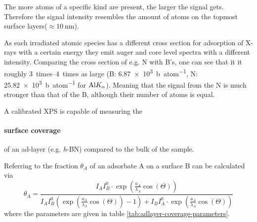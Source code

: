 The more atoms of a specific kind are present, the larger the signal gets. Therefore the signal intensity resembles the amount of atoms on the topmost surface layers($\approx \SI{10}{\nm}$).

As each irradiated atomic species has a different cross section for adsorption of X-rays with a certain energy they emit auger and core level spectra with a different intensity. Comparing the cross section of e.g. N with B's, one can see that it it roughly \SIrange{3}{4}{times} as large (B: \SI{6,87e3}{\barn\per atom}, N: \SI{25,82e3}{\barn\per atom} for $\textnormal{Al} K_{\alpha}$)\cite{henke_x-ray_1993}. Meaning that the signal from the N is much stronger than that of the B, although their number of atoms is equal.

A calibrated XPS is capable of measuring the \paragraph{surface coverage} of an ad-layer (e.g. \textit{h}-BN) compared to the bulk of the sample. 

Referring to \cite{ertl_low_1986} the fraction $\theta_A$ of an adsorbate A on a surface B can be calculated via
\begin{equation}\label{eq:adlayer-coverage}
 \theta_A=\frac{I_AI_B^0\cdot \exp(\frac{a_A}{\lambda_A}\cos(\Theta))}{I_AI_B^0( \exp(\frac{a_A}{\lambda_A}\cos(\Theta))-1)+I_BI_A^0\cdot \exp(\frac{a_A}{\lambda_A}\cos(\Theta))}
\end{equation}
where the parameters are given in table \ref{tab:adlayer-coverage-parameters}.

